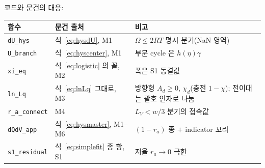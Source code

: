 \documentclass[11pt,a4paper]{article}
\begin{document}
코드와 문건의 대응:
\begin{center}
\renewcommand{\arraystretch}{1.3}
\begin{tabular}{p{} p{} p{}}
\toprule
함수 & 문건 출처 & 비고 \\
\midrule
\texttt{dU\_hys} & 식~\eqref{eq:hysdU}, M1 & $\Omega\le2RT$ 명시 분기(NaN 영역) \\
\texttt{U\_branch} & 식~\eqref{eq:hyscenter}, M1 & 부분 cycle 은 $h(\eta)\gamma$ \\
\texttt{xi\_eq} & 식~\eqref{eq:logistic} 의 꼴, M2 & 폭은 S1 동결값 \\
\texttt{ln\_Lq} & 식~\eqref{eq:lnLq} 그대로, M3 & 방향형 $A_d\ge0$, $\chi_d$(충전 $1-\chi$); 전이대는 괄호 인자로 나눔 \\
\texttt{r\_a\_connect} & M4 & $L_V<w/3$ 분기의 접속값 \\
\texttt{dQdV\_app} & 식~\eqref{eq:hysmaster}, M1--M6 & $(1-r_a)$ 종 $+$ indicator 꼬리 \\
\texttt{s1\_residual} & 식~\eqref{eq:simplefit} 종 항, S1 & 저율 $r_a\to0$ 극한 \\
\bottomrule
\end{tabular}
\end{center}
\end{document}
